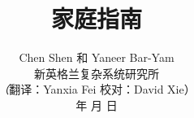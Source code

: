 \documentclass[onecolumn,journal]{IEEEtran}
\begin{document}
\title{\color{Brown} 家庭指南 \\
\vspace{-0.35ex}}
\author{Chen Shen 和 Yaneer Bar-Yam \\ 新英格兰复杂系统研究所 \\
\vspace{+0.35ex}
\small{\textit（{翻译：Yanxia Fei  校对：David Xie}）}\\
  年  月  日
  \vspace{-14ex} \\


\bigskip
\bigskip

\textbf{}
 }

\maketitle


\flushbottom %



\thispagestyle{empty} %




\renewcommand{\thefootnote}{\fnsymbol{footnote}}
\end{document}
